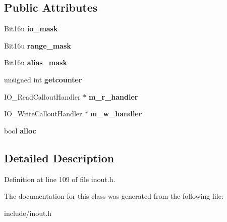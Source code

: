 \subsection*{Public Attributes}
\begin{DoxyCompactItemize}
\item 
\hypertarget{classIO__CalloutObject_a5ae148d6c5bc87e8923b556d38530eb4}{Bit16u {\bfseries io\-\_\-mask}}\label{classIO__CalloutObject_a5ae148d6c5bc87e8923b556d38530eb4}

\item 
\hypertarget{classIO__CalloutObject_a8b820c98cb5ad379c2d6dd856cf219d8}{Bit16u {\bfseries range\-\_\-mask}}\label{classIO__CalloutObject_a8b820c98cb5ad379c2d6dd856cf219d8}

\item 
\hypertarget{classIO__CalloutObject_a65b61522259efdf57e0cd64f3624647c}{Bit16u {\bfseries alias\-\_\-mask}}\label{classIO__CalloutObject_a65b61522259efdf57e0cd64f3624647c}

\item 
\hypertarget{classIO__CalloutObject_a95f1864767f4afa68249ed9dbf5b8585}{unsigned int {\bfseries getcounter}}\label{classIO__CalloutObject_a95f1864767f4afa68249ed9dbf5b8585}

\item 
\hypertarget{classIO__CalloutObject_a630150d967b794733d134236e3cb4adf}{I\-O\-\_\-\-Read\-Callout\-Handler $\ast$ {\bfseries m\-\_\-r\-\_\-handler}}\label{classIO__CalloutObject_a630150d967b794733d134236e3cb4adf}

\item 
\hypertarget{classIO__CalloutObject_a99b204ed0c61306168713e862e64d779}{I\-O\-\_\-\-Write\-Callout\-Handler $\ast$ {\bfseries m\-\_\-w\-\_\-handler}}\label{classIO__CalloutObject_a99b204ed0c61306168713e862e64d779}

\item 
\hypertarget{classIO__CalloutObject_ac5829f78cf89ab96657e3fcc8b4b6da0}{bool {\bfseries alloc}}\label{classIO__CalloutObject_ac5829f78cf89ab96657e3fcc8b4b6da0}

\end{DoxyCompactItemize}


\subsection{Detailed Description}


Definition at line 109 of file inout.\-h.



The documentation for this class was generated from the following file\-:\begin{DoxyCompactItemize}
\item 
include/inout.\-h\end{DoxyCompactItemize}
